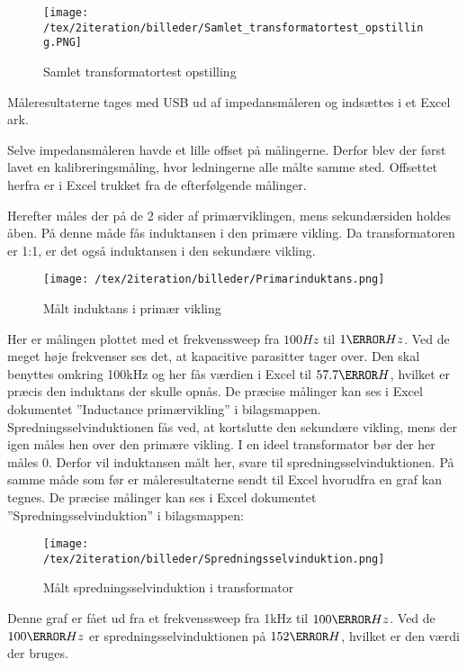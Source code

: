 \begin{figure}[H]
	\center
	\texttt{[image: /tex/2iteration/billeder/Samlet\_transformatortest\_opstilling.PNG]}
	\caption{Samlet transformatortest opstilling}
	\label{fig: Transopstilling}
\end{figure}

\noindent Måleresultaterne tages med USB ud af impedansmåleren og indsættes i et Excel ark.  

\noindent Selve impedansmåleren havde et lille offset på målingerne. Derfor blev der først lavet en kalibreringsmåling, hvor ledningerne alle målte samme sted. Offsettet herfra er i Excel trukket fra de efterfølgende målinger.    

\noindent Herefter måles der på de 2 sider af primærviklingen, mens sekundærsiden holdes åben. På denne måde fås induktansen i den primære vikling. Da transformatoren er 1:1, er det også induktansen i den sekundære vikling. 
\begin{figure}[H]
	\center
	\texttt{[image: /tex/2iteration/billeder/Primarinduktans.png]}
	\caption{Målt induktans i primær vikling}
	\label{fig: Primarinduktans}
\end{figure}
\noindent Her er målingen plottet med et frekvenssweep fra $100Hz$ til $1\mega Hz$. Ved de meget høje frekvenser ses det, at kapacitive parasitter tager over. Den skal benyttes omkring 100kHz og her fås værdien i Excel til $57.7\micro H$, hvilket er præcis den induktans der skulle opnås. De præcise målinger kan ses i Excel dokumentet ”Inductance primærvikling” i bilagsmappen. 
Spredningsselvinduktionen fås ved, at kortslutte den sekundære vikling, mens der igen måles hen over den primære vikling. I en ideel transformator bør der her måles 0. Derfor vil induktansen målt her, svare til spredningsselvinduktionen. På samme måde som før er måleresultaterne sendt til Excel hvorudfra en graf kan tegnes. De præcise målinger kan ses i Excel dokumentet ”Spredningsselvinduktion” i bilagsmappen:
\begin{figure}[H]
	\center
	\texttt{[image: /tex/2iteration/billeder/Spredningsselvinduktion.png]}
	\caption{Målt spredningsselvinduktion i transformator}
	\label{fig: leakageinductance}
\end{figure}
\noindent Denne graf er fået ud fra et frekvenssweep fra 1kHz til $100\kilo Hz$. Ved de $100\kilo Hz$ er spredningsselvinduktionen på $152\nano H$, hvilket er den værdi der bruges. 



